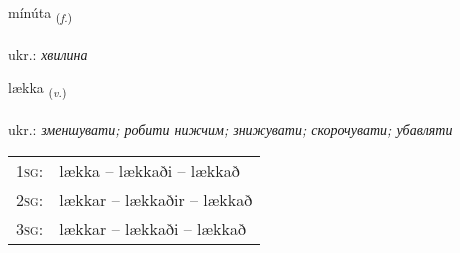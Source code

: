 \documentclass[frontgrid, backgrid]{flacards}\usepackage[]{graphicx}\usepackage[]{xcolor}
\begin{document}
\renewcommand{\flhead}{\vskip5pt \fboxsep=0pt {\small\bfseries\footnotesize Nafnorð | іменник}}
\renewcommand{\fcfoot}{\vskip5pt \fboxsep=0pt \hspace{2pt}{\small\bfseries\footnotesize 1K}}

\renewcommand{\blhead}{\vskip5pt {\small\bfseries\footnotesize Nafnorð | іменник }}
\renewcommand{\bcfoot}{\vskip5pt \hspace{2pt}{\small\bfseries\footnotesize 1K}}


{mínúta \small{\textsubscript{(\textit{f.})}} \\[1ex] %
\textphonetic{[miːnuta]} \\
ukr.: \emph{хвилина} \\  [2ex]
\renewcommand*{\arraystretch}{0.8}
}

\renewcommand{\flhead}{\vskip5pt \fboxsep=0pt {\small\bfseries\footnotesize Sagnorð | дієслово}}
\renewcommand{\fcfoot}{\vskip5pt \fboxsep=0pt \hspace{2pt}{\small\bfseries\footnotesize 1K}}

\renewcommand{\blhead}{\vskip5pt {\small\bfseries\footnotesize Sagnorð | дієслово }}
\renewcommand{\bcfoot}{\vskip5pt \hspace{2pt}{\small\bfseries\footnotesize 1K}}


{lækka \small{\textsubscript{(\textit{v.})}} \\[1ex] %
\textphonetic{[laihka]} \\
ukr.: \emph{зменшувати; робити нижчим; знижувати; скорочувати; убавляти} \\  [2ex]
\renewcommand*{\arraystretch}{0.8}
\begin{tabular}{p{1cm}l}
\textsc{1sg}: & lækka -- lækkaði -- lækkað \\ 
\textsc{2sg}: & lækkar -- lækkaðir -- lækkað \\ 
\textsc{3sg}: & lækkar -- lækkaði -- lækkað \\ 
\end{tabular}
}
\end{document}
